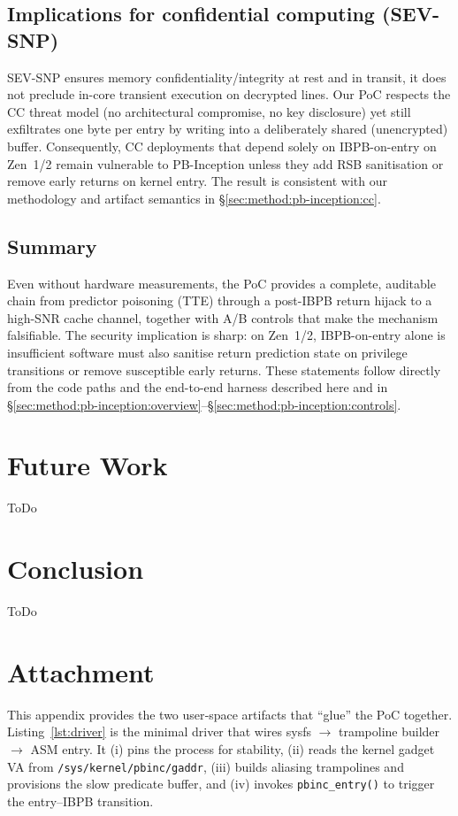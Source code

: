 \documentclass[11pt,a4paper]{article}
\begin{document}
\subsection{Implications for confidential computing (SEV-SNP)}
SEV-SNP ensures memory confidentiality/integrity at rest and in transit, it does not preclude in-core transient execution on decrypted lines. Our PoC respects the CC threat model (no architectural compromise, no key disclosure) yet still exfiltrates one byte per entry by writing into a deliberately shared (unencrypted) buffer. Consequently, CC deployments that depend solely on IBPB-on-entry on Zen~1/2 remain vulnerable to PB-Inception unless they add RSB sanitisation or remove early returns on kernel entry. The result is consistent with our methodology and artifact semantics in \S\ref{sec:method:pb-inception:cc}.\cite{wikner2025breaking,linux_srso_doc}

\subsection{Summary}
Even without hardware measurements, the PoC provides a complete, auditable chain from predictor poisoning (TTE) through a post-IBPB return hijack to a high-SNR cache channel, together with A/B controls that make the mechanism falsifiable. The security implication is sharp: on Zen~1/2, IBPB-on-entry alone is insufficient software must also sanitise return prediction state on privilege transitions or remove susceptible early returns. These statements follow directly from the code paths and the end-to-end harness described here and in \S\ref{sec:method:pb-inception:overview}--\S\ref{sec:method:pb-inception:controls}.\cite{wikner2025breaking,trujillo2023inception,linux_srso_doc,linux_rsb_doc}

\section{Future Work}
ToDo


\section{Conclusion}
ToDo



\section{Attachment}
This appendix provides the two user‑space artifacts that “glue” the PoC together. 
Listing~\ref{lst:driver} is the minimal driver that wires sysfs $\rightarrow$ 
trampoline builder $\rightarrow$ ASM entry. It (i) pins the process for stability, 
(ii) reads the kernel gadget VA from \texttt{/sys/kernel/pbinc/gaddr}, 
(iii) builds aliasing trampolines and provisions the slow predicate buffer, and 
(iv) invokes \texttt{pbinc\_entry()} to trigger the entry–IBPB transition.
\end{document}
